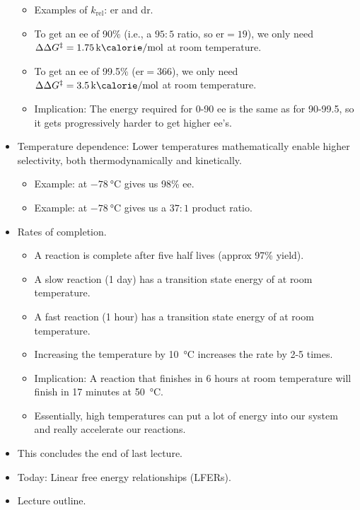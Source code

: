 \documentclass[../notes.tex]{subfiles}
\begin{document}
\begin{itemize}
\begin{itemize}
        \item Examples of $k_\text{rel}$: er and dr.
        \item To get an ee of 90\% (i.e., a $95:5$ ratio, so $\text{er}=19$), we only need $\Delta\Delta G^\ddagger=\kcal{1.75}$ at room temperature.
        \item To get an ee of 99.5\% ($\text{er}=366$), we only need $\Delta\Delta G^\ddagger=\kcal{3.5}$ at room temperature.
        \item Implication: The energy required for 0-90 ee is the same as for 90-99.5, so it gets progressively harder to get higher ee's.
    \end{itemize}
    \item Temperature dependence: Lower temperatures mathematically enable higher selectivity, both thermodynamically and kinetically.
    \begin{itemize}
        \item Example:  at $-\SI{78}{\celsius}$ gives us 98\% ee.
        \item Example:  at $-\SI{78}{\celsius}$ gives us a $37:1$ product ratio.
    \end{itemize}
    \item Rates of completion.
    \begin{itemize}
        \item A reaction is complete after five half lives (approx 97\% yield).
        \item A slow reaction (1 day) has a transition state energy of  at room temperature.
        \item A fast reaction (1 hour) has a transition state energy of  at room temperature.
        \item Increasing the temperature by \SI{10}{\celsius} increases the rate by 2-5 times.
        \item Implication: A reaction that finishes in 6 hours at room temperature will finish in 17 minutes at \SI{50}{\celsius}.
        \item Essentially, high temperatures can put a lot of energy into our system and really accelerate our reactions.
    \end{itemize}
    \item This concludes the end of last lecture.
    \item Today: Linear free energy relationships (LFERs).
    \item Lecture outline.
    \begin{itemize}

\end{itemize}
\end{itemize}
\end{document}
